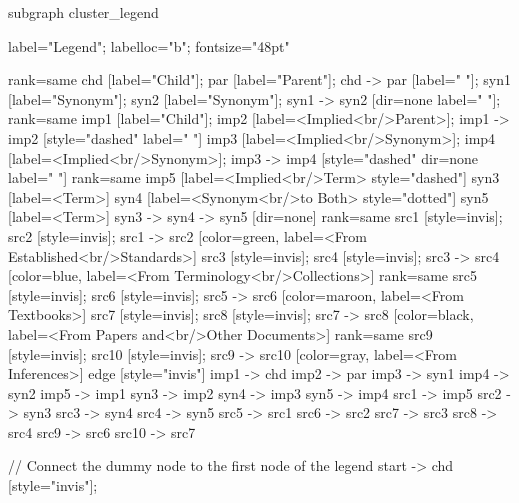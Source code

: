\documentclass{article}
\begin{document}
{subgraph cluster_legend {

    label="Legend";
    labelloc="b";
    fontsize="48pt"

    {
        rank=same
        chd [label="Child"];
        par [label="Parent"];
        chd -> par [label="                "];
        syn1 [label="Synonym"];
        syn2 [label="Synonym"];
        syn1 -> syn2 [dir=none label="                "];
    }
    {
        rank=same
        imp1 [label="Child"];
        imp2 [label=<Implied<br/>Parent>];
        imp1 -> imp2 [style="dashed" label="                "]
        imp3 [label=<Implied<br/>Synonym>];
        imp4 [label=<Implied<br/>Synonym>];
        imp3 -> imp4 [style="dashed" dir=none label="                "]
    }
    {
        rank=same
        imp5 [label=<Implied<br/>Term> style="dashed"]
        syn3 [label=<Term>]
        syn4 [label=<Synonym<br/>to Both> style="dotted"]
        syn5 [label=<Term>]
        syn3 -> syn4 -> syn5 [dir=none]
    }
{
rank=same
src1 [style=invis];
src2 [style=invis];
src1 -> src2 [color=green, label=<From Established<br/>Standards>]
src3 [style=invis];
src4 [style=invis];
src3 -> src4 [color=blue, label=<From Terminology<br/>Collections>]
}
{
rank=same
src5 [style=invis];
src6 [style=invis];
src5 -> src6 [color=maroon, label=<From Textbooks>]
src7 [style=invis];
src8 [style=invis];
src7 -> src8 [color=black, label=<From Papers and<br/>Other Documents>]
}
{
rank=same
src9 [style=invis];
src10 [style=invis];
src9 -> src10 [color=gray, label=<From Inferences>]
}
edge [style="invis"]
imp1 -> chd
imp2 -> par
imp3 -> syn1
imp4 -> syn2
imp5 -> imp1
syn3 -> imp2
syn4 -> imp3
syn5 -> imp4
src1 -> imp5
src2 -> syn3
src3 -> syn4
src4 -> syn5
src5 -> src1
src6 -> src2
src7 -> src3
src8 -> src4
src9 -> src6
src10 -> src7
}

// Connect the dummy node to the first node of the legend
start -> chd [style="invis"];
}
\end{document}

